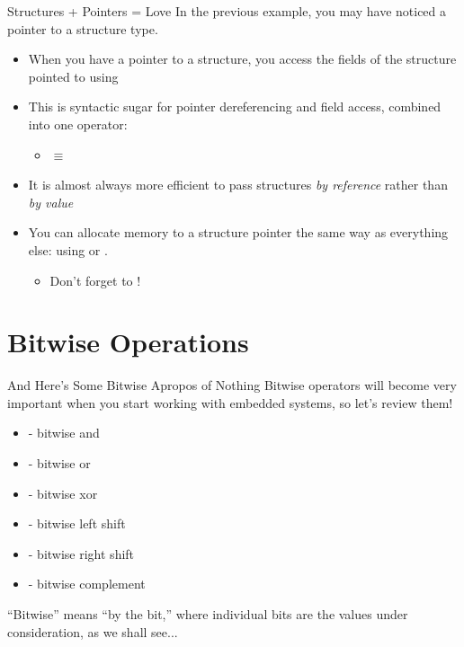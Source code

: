 \documentclass[11pt]{beamer}
\let\OldTexttt\texttt
\renewcommand{\texttt}[1]{\OldTexttt{\color{teal}{#1}}}
\begin{document}
\begin{frame}{Structures + Pointers = Love}
In the previous example, you may have noticed a pointer to a structure type.
\begin{itemize}
\item When you have a pointer to a structure, you access the fields of the structure pointed to using \texttt{-\textgreater}
\item This is syntactic sugar for pointer dereferencing and field access, combined into one operator:
\begin{itemize}
\item \texttt{x -\textgreater y} $\equiv$ \texttt{(*x).y}
\end{itemize}
\item It is almost always more efficient to pass structures \emph{by reference} rather than \emph{by value}
\item You can allocate memory to a structure pointer the same way as everything else: using \texttt{malloc()} or \texttt{calloc()}.
\begin{itemize}
\item Don't forget to \texttt{free()}!
\end{itemize}
\end{itemize}
\end{frame}

\section[Bitwise]{Bitwise Operations}
\begin{frame}{And Here's Some Bitwise Apropos of Nothing}
Bitwise operators will become very important when you start working with embedded systems, so let's review them! 
\begin{itemize}
\item \texttt{\&} - bitwise and
\item \texttt{\textbar} - bitwise or
\item \texttt{\textasciicircum} - bitwise xor
\item \texttt{\textless\textless} - bitwise left shift
\item \texttt{\textgreater\textgreater} - bitwise right shift
\item \texttt{\textasciitilde} - bitwise complement
\end{itemize}
``Bitwise'' means ``by the bit,'' where individual bits are the values under consideration, as we shall see...
\end{frame}
\end{document}
